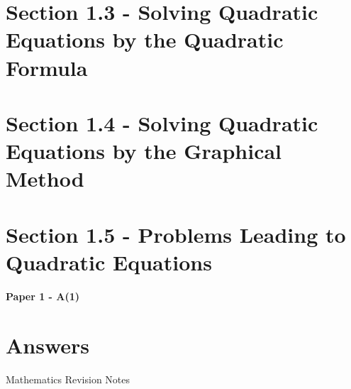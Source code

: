 \documentclass[12pt, a4paper]{article}
\begin{document}
\section*{Section 1.3 - Solving Quadratic Equations by the Quadratic Formula}\label{section:4-1-3}





\section*{Section 1.4 - Solving Quadratic Equations by the Graphical Method}\label{section:4-1-4}





\section*{Section 1.5 - Problems Leading to Quadratic Equations}\label{section:4-1-5}

\textbf{Paper 1 - A(1)}
\begin{enumx}[label=\arabic*.,start=4]
\item {}\label{DSE2019-CoreP1-Q03} 
\end{enumx}
\section*{Answers}
\begin{enumx}[label=\arabic*.,start=1]
\item {}
\item {}
\item {}
\item {}
\end{enumx}
\newpage
\newpage
\thispagestyle{empty}
\begin{center}
Mathematics Revision Notes\\\vspace{1cm}
\\\vspace{1cm}
{\fontsize{24pt}{24pt}\selectfont {Quadratic Equations in One Unknown (II)}} \\\vspace{1cm}
\label{chapter:S4-2}

\end{center}
\vspace{0.5cm}
\hline
\end{document}
